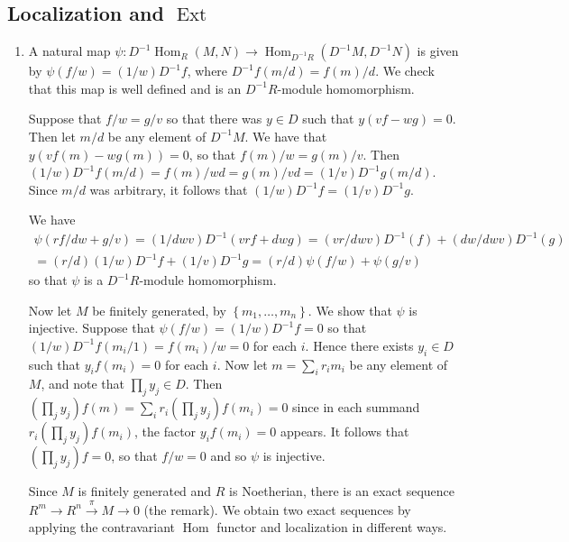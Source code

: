 \documentclass[11pt]{article}
\newcommand{\cbr}[1]{\left\{#1\right\}}
\DeclareMathOperator{\Hom}{Hom}
\DeclareMathOperator{\Ext}{Ext}
\begin{document}
\subsection*{Localization and $\Ext$}
\begin{enumerate}[label=(\alph*)]
  \item A natural map $\psi\colon D^{-1}\Hom_R(M,N)\to \Hom_{D^{-1}R}(D^{-1}M,D^{-1}N)$ is given by $\psi(f/w) = (1/w)D^{-1}f$, where $D^{-1}f(m/d) = f(m)/d$. We check that this map is well defined and is an $D^{-1}R$-module homomorphism.
  
  Suppose that $f/w = g/v$ so that there was $y\in D$ such that $y(vf-wg)=0$. Then let $m/d$ be any element of $D^{-1}M$. We have that $y(vf(m)-wg(m))=0$, so that $f(m)/w = g(m)/v$. Then $(1/w)D^{-1}f(m/d) = f(m)/wd = g(m)/vd = (1/v)D^{-1}g(m/d)$. Since $m/d$ was arbitrary, it follows that $(1/w)D^{-1}f = (1/v)D^{-1}g$.

  We have \begin{multline*}
    \psi(rf/dw + g/v) = (1/dwv)D^{-1}(vrf+dwg) = (vr/dwv)D^{-1}(f) + (dw/dwv)D^{-1}(g) \\ = (r/d)(1/w)D^{-1}f + (1/v)D^{-1}g = (r/d)\psi(f/w) + \psi(g/v)
  \end{multline*} so that $\psi$ is a $D^{-1}R$-module homomorphism.

  Now let $M$ be finitely generated, by $\cbr{m_1,\dots,m_n}$. We show that $\psi$ is injective. Suppose that $\psi(f/w) = (1/w)D^{-1}f = 0$ so that $(1/w)D^{-1}f(m_i/1) = f(m_i)/w = 0$ for each $i$. Hence there exists $y_i\in D$ such that $y_if(m_i) = 0$ for each $i$. Now let $m = \sum_i r_im_i$ be any element of $M$, and note that $\prod_j y_j\in D$. Then $(\prod_j y_j)f(m) = \sum_i r_i(\prod_j y_j)f(m_i) = 0$ since in each summand $r_i(\prod_j y_j)f(m_i)$, the factor $y_if(m_i) = 0$ appears. It follows that $(\prod_j y_j)f = 0$, so that $f/w = 0$ and so $\psi$ is injective.

  Since $M$ is finitely generated and $R$ is Noetherian, there is an exact sequence $R^m\to R^n\xrightarrow{\pi} M\to 0$ (the remark). We obtain two exact sequences by applying the contravariant $\Hom$ functor and localization in different ways. 


\end{enumerate}
\end{document}

